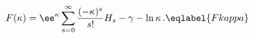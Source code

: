\begin{equation}
F(\kappa) = \ee^\kappa \sum_{s=0}^\infty 
\frac{(-\kappa)^s}{s!} H_s - \gamma - \ln\kappa \,.
\eqlabel{Fkappa}
\end{equation}

